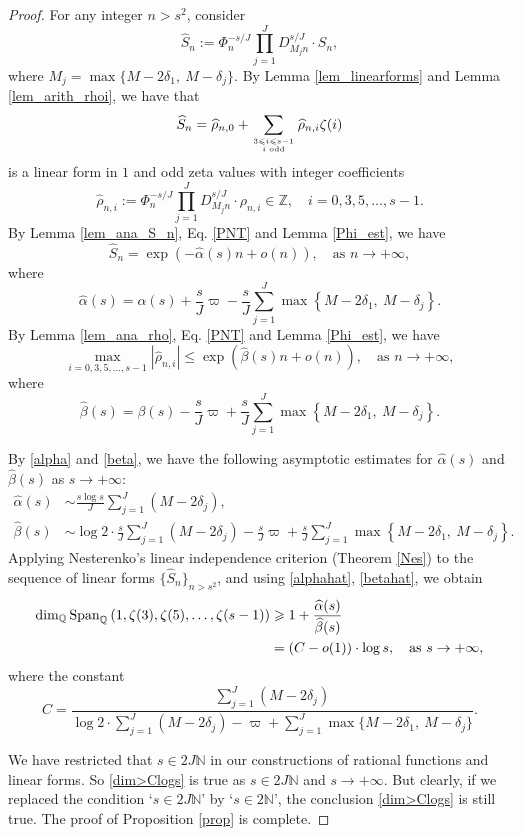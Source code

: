\documentclass[12pt]{article}
\numberwithin{equation}{section}
\begin{document}
\bigskip

\begin{proof}
For any integer $n>s^2$, consider  
\[ \widehat{S}_n := \Phi_n^{-s/J} \prod_{j=1}^{J} D_{M_jn}^{s/J} \cdot S_n, \]
where $M_j = \max\{ M-2\delta_1,~M-\delta_j \}$. By Lemma \ref{lem_linearforms} and Lemma \ref{lem_arith_rhoi}, we have that
\[ \widehat{S}_n = \widehat{\rho}_{n,0} + \sum_{3 \leqslant i \leqslant s-1 \atop i \text{~odd}} \widehat{\rho}_{n,i}\zeta(i)  \]
is a linear form in $1$ and odd zeta values with integer coefficients
\[ \widehat{\rho}_{n,i} := \Phi_n^{-s/J} \prod_{j=1}^{J} D_{M_jn}^{s/J} \cdot \rho_{n,i} \in \mathbb{Z}, \quad i=0,3,5,\ldots,s-1. \]
By Lemma \ref{lem_ana_S_n}, Eq. \eqref{PNT} and Lemma \ref{Phi_est}, we have
\[ \widehat{S}_n = \exp\left( -\widehat{\alpha}(s)n+o(n) \right),  \quad \text{as~} n\to +\infty, \]
where
\[ \widehat{\alpha}(s) = \alpha(s) + \frac{s}{J}\varpi - \frac{s}{J}\sum_{j=1}^{J} \max\left\{ M-2\delta_1,~M-\delta_j \right\}. \]
By Lemma \ref{lem_ana_rho}, Eq. \eqref{PNT} and Lemma \ref{Phi_est}, we have
\[ \max_{i=0,3,5,\ldots,s-1} |\widehat{\rho}_{n,i}| \leqslant \exp\left( \widehat{\beta}(s)n + o(n) \right), \quad \text{as~} n\to +\infty, \]
where
\[ \widehat{\beta}(s) = \beta(s) - \frac{s}{J}\varpi + \frac{s}{J}\sum_{j=1}^{J} \max\left\{ M-2\delta_1,~M-\delta_j \right\}. \]

By \eqref{alpha} and \eqref{beta}, we have the following asymptotic estimates for $\widehat{\alpha}(s)$ and $\widehat{\beta}(s)$ as $s \to +\infty$:
\begin{align}
	\widehat{\alpha}(s) &\sim  \frac{s\log s}{J}\sum_{j=1}^{J}(M-2\delta_j),   \label{alphahat}\\
	\widehat{\beta}(s) &\sim  \log 2 \cdot \frac{s}{J}\sum_{j=1}^{J}(M-2\delta_j) - \frac{s}{J}\varpi + \frac{s}{J}\sum_{j=1}^{J} \max\left\{ M-2\delta_1,~M-\delta_j \right\}. \label{betahat}
\end{align}
Applying Nesterenko's linear independence criterion (Theorem \ref{Nes}) to the sequence of linear forms $\{ \widehat{S}_n \}_{n > s^2}$, and using \eqref{alphahat}, \eqref{betahat}, we obtain
\begin{align}
\dim_{\mathbb{Q}}\operatorname{Span}_{\mathbb{Q}}\left( 1,\zeta(3),\zeta(5),\ldots,\zeta(s-1) \right) &\geqslant 1 +\frac{\widehat{\alpha}(s)}{\widehat{\beta}(s)} \notag \\
&= (C-o(1)) \cdot \log s, \quad \text{as~} s \to +\infty, \label{dim>Clogs}
\end{align}
where the constant
\begin{equation*}
C = \frac{\sum_{j=1}^{J} (M-2\delta_j) }{\log2 \cdot \sum_{j=1}^{J}(M-2\delta_j)  - \varpi  + \sum_{j=1}^{J} \max\{ M-2\delta_1,~M-\delta_j \}}. 
\end{equation*}

We have restricted that $s \in 2J\mathbb{N}$ in our constructions of rational functions and linear forms. So
\eqref{dim>Clogs} is true as $s \in 2J\mathbb{N}$ and $s \to +\infty$. But clearly, if we replaced the condition `$s \in 2J\mathbb{N}$' by `$s \in 2\mathbb{N}$', the conclusion \eqref{dim>Clogs} is still true. The proof of Proposition \ref{prop} is complete.
\end{proof}
\end{document}
